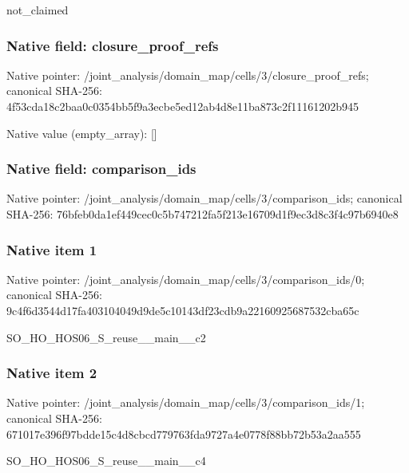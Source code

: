 \documentclass[10pt,a4paper]{article}
\begin{document}
\begingroup\raggedright\sloppy not\_\allowbreak{}claimed\par\endgroup

\subsubsection{Native field: closure\_\allowbreak{}proof\_\allowbreak{}refs}
Native pointer: /joint\_\allowbreak{}analysis/domain\_\allowbreak{}map/cells/3/closure\_\allowbreak{}proof\_\allowbreak{}refs; canonical SHA-256: 4f53cda18c2baa0c0354bb5f9a3ecbe5ed12ab4d8e11ba873c2f11161202b945

Native value (empty\_\allowbreak{}array): []

\subsubsection{Native field: comparison\_\allowbreak{}ids}
Native pointer: /joint\_\allowbreak{}analysis/domain\_\allowbreak{}map/cells/3/comparison\_\allowbreak{}ids; canonical SHA-256: 76bfeb0da1ef449cec0c5b747212fa5f213e16709d1f9ec3d8c3f4c97b6940e8

\subsubsection{Native item 1}
Native pointer: /joint\_\allowbreak{}analysis/domain\_\allowbreak{}map/cells/3/comparison\_\allowbreak{}ids/0; canonical SHA-256: 9c4f6d3544d17fa403104049d9de5c10143df23cdb9a22160925687532cba65c

\begingroup\raggedright\sloppy SO\_\allowbreak{}HO\_\allowbreak{}HOS06\_\allowbreak{}S\_\allowbreak{}reuse\_\allowbreak{}\_\allowbreak{}main\_\allowbreak{}\_\allowbreak{}c2\par\endgroup

\subsubsection{Native item 2}
Native pointer: /joint\_\allowbreak{}analysis/domain\_\allowbreak{}map/cells/3/comparison\_\allowbreak{}ids/1; canonical SHA-256: 671017e396f97bdde15c4d8cbcd779763fda9727a4e0778f88bb72b53a2aa555

\begingroup\raggedright\sloppy SO\_\allowbreak{}HO\_\allowbreak{}HOS06\_\allowbreak{}S\_\allowbreak{}reuse\_\allowbreak{}\_\allowbreak{}main\_\allowbreak{}\_\allowbreak{}c4\par\endgroup
\end{document}

